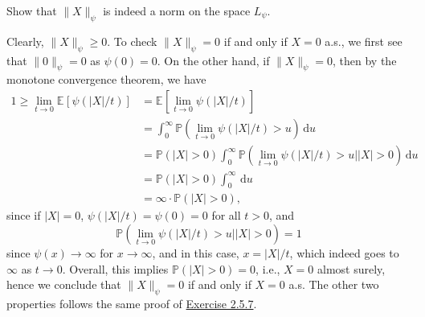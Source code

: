 \begin{problem*}[Exercise 2.7.11]\label{ex2.7.11}
	Show that \(\lVert X \rVert _{\psi }\) is indeed a norm on the space \(L_{\psi } \).
\end{problem*}
\begin{answer}
	Clearly, \(\lVert X \rVert _{\psi } \geq 0\). To check \(\lVert X \rVert _{\psi } = 0\) if and only if \(X = 0\) a.s., we first see that \(\lVert 0 \rVert _{\psi } = 0\) as \(\psi (0) = 0\). On the other hand, if \(\lVert X \rVert _{\psi } = 0\), then by the monotone convergence theorem, we have
	\[
		\begin{split}
			1
			\geq \lim_{t \to 0} \mathbb{E}_{}[\psi (\vert X \vert / t)]
			 & = \mathbb{E}_{}\left[ \lim_{t \to 0} \psi (\vert X \vert / t) \right]                                                                                        \\
			 & = \int_{0}^{\infty} \mathbb{P} \left( \lim_{t \to 0} \psi (\vert X \vert / t) > u \right)  \,\mathrm{d}u                                                     \\
			 & = \mathbb{P} (\vert X \vert > 0) \int_{0}^{\infty} \mathbb{P} \left( \lim_{t \to 0} \psi (\vert X \vert / t) > u \mid \vert X \vert > 0\right) \,\mathrm{d}u \\
			 & = \mathbb{P} (\vert X \vert > 0) \int_{0}^{\infty} \,\mathrm{d}u                                                                                             \\
			 & = \infty \cdot \mathbb{P} (\vert X \vert > 0),
		\end{split}
	\]
	since if \(\vert X \vert = 0\), \(\psi (\vert X \vert / t) = \psi (0) = 0\) for all \(t > 0\), and
	\[
		\mathbb{P} \left( \lim_{t \to 0} \psi (\vert X \vert / t) > u \mid \vert X \vert > 0 \right)
		= 1
	\]
	since \(\psi (x) \to \infty \) for \(x \to \infty \), and in this case, \(x = \vert X \vert / t\), which indeed goes to \(\infty \) as \(t \to 0\). Overall, this implies \(\mathbb{P} (\vert X \vert > 0) = 0\), i.e., \(X = 0\) almost surely, hence we conclude that \(\lVert X \rVert _{\psi } = 0 \) if and only if \(X = 0\) a.s. The other two properties follows the same proof of \hyperref[ex2.5.7]{Exercise 2.5.7}.
\end{answer}

